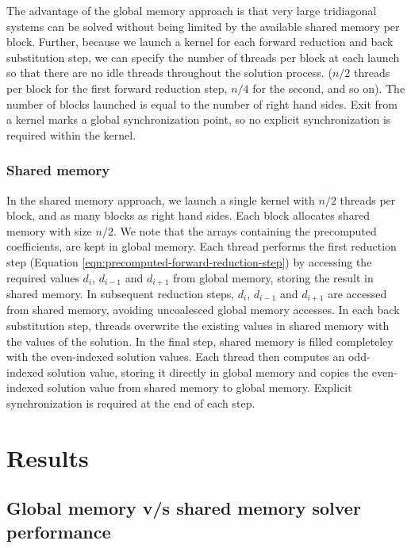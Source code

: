 \documentclass{elsarticle}
\begin{document}
The advantage of the global memory approach is that
very large tridiagonal systems can be solved without
being limited by the available shared memory per block.
Further,
because we launch a kernel for each
forward reduction and back substitution step,
we can specify the number of threads per block at each launch so that
there are no idle threads throughout the solution process.
($n/2$ threads per block for the first forward reduction step,
$n/4$ for the second, and so on).
The number of blocks launched is equal to the number of right
hand sides.
Exit from a kernel marks a global synchronization point,
so no explicit synchronization is required within the kernel.

\subsubsection*{Shared memory}

In the shared memory approach,
we launch a single kernel with $n/2$ threads per block,
and as many blocks as right hand sides.
Each block allocates shared memory with size $n/2$.
We note that the arrays containing the precomputed coefficients,
are kept in global memory.
Each thread performs the first reduction step
(Equation \ref{eqn:precomputed-forward-reduction-step})
by accessing the required values
$d_i$, $d_{i-1}$ and $d_{i+1}$ from global memory,
storing the result in shared memory.
In subsequent reduction steps,
$d_i$, $d_{i-1}$ and $d_{i+1}$
are accessed from shared memory,
avoiding uncoalesced global memory accesses.
In each back substitution step,
threads overwrite the existing values in shared memory
with the values of the solution.
In the final step,
shared memory is filled completeley
with the even-indexed solution values.
Each thread then computes an odd-indexed solution value,
storing it directly in global memory
and copies the even-indexed solution value
from shared memory to global memory.
Explicit synchronization is required at the end of each step.


\pagebreak
\section{Results} \label{sec:results-single-gpu}

\subsection{Global memory v/s shared memory solver performance}
\end{document}
